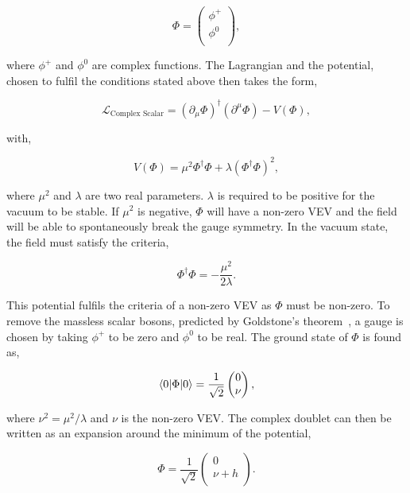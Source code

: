 \begin{equation}
	\Phi = 
	\begin{pmatrix} 
		\phi^{+} \\
		\phi^{0} \\
	\end{pmatrix},
\end{equation}

where $\phi^{+}$ and $\phi^{0}$ are complex functions.
The Lagrangian and the potential, chosen to fulfil the conditions stated above then takes the form,

\begin{equation}
	\mathcal{L}_{\text{Complex Scalar}} = (\partial_{\mu}\Phi)^{\dagger} (\partial^{\mu}\Phi) - V(\Phi),
\end{equation}

with,

\begin{equation}
V(\Phi) = \mu^2 \Phi^{\dagger} \Phi + \lambda (\Phi^{\dagger} \Phi)^2,
\end{equation}

where $\mu^2$ and $\lambda$ are two real parameters. 
$\lambda$ is required to be positive for the vacuum to be stable.
If $\mu^2$ is negative, $\Phi$ will have a non-zero \ac{VEV} and the field will be able to spontaneously break the gauge symmetry.
In the vacuum state, the field must satisfy the criteria,

\begin{equation}
\Phi^{\dagger} \Phi = -\frac{\mu^2}{2\lambda}.
\end{equation}

This potential fulfils the criteria of a non-zero \ac{VEV} as $\Phi$ must be non-zero. 
To remove the massless scalar bosons, predicted by Goldstone's theorem~\cite{Goldstone:1961eq}, a gauge is chosen by taking $\phi^+$ to be zero and $\phi^0$ to be real. 
The ground state of $\Phi$ is found as,

\begin{equation}
\braket{0|\Phi|0} = \frac{1}{\sqrt{2}}
	\begin{pmatrix} 
		0 \\
		\nu \\
	\end{pmatrix},
\end{equation}

where $\nu^2 = \mu^2 / \lambda$ and $\nu$ is the non-zero \ac{VEV}.
The complex doublet can then be written as an expansion around the minimum of the potential,

\begin{equation}
\Phi = \frac{1}{\sqrt{2}}
	\begin{pmatrix} 
		0 \\
		\nu + h\\
	\end{pmatrix}.
\end{equation}

